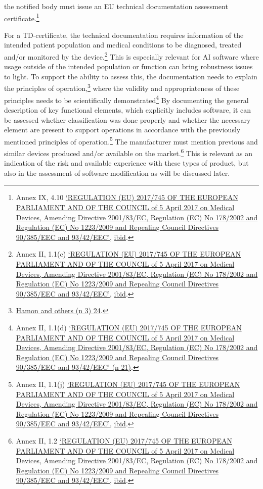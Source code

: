 \documentclass[
]{scrartcl}
\begin{document}
the notified body must issue an EU technical documentation assessment certificate.\footnote{Annex IX, 4.10 \protect\hyperlink{ref-REGULATIONEU2017a}{{`{REGULATION} ({EU}) 2017/745 {OF THE EUROPEAN PARLIAMENT AND OF THE COUNCIL} of 5 {April} 2017 on Medical Devices, Amending {Directive} 2001/83/{EC}, {Regulation} ({EC}) {No} 178/2002 and {Regulation} ({EC}) {No} 1223/2009 and Repealing {Council Directives} 90/385/{EEC} and 93/42/{EEC}'}}, \protect\hyperlink{ref-REGULATIONEU2017a}{ibid}.}

For a TD-certificate, the technical documentation requires information of the intended patient population and medical conditions to be diagnosed, treated and/or monitored by the device.\footnote{Annex II, 1.1(c) \protect\hyperlink{ref-REGULATIONEU2017a}{{`{REGULATION} ({EU}) 2017/745 {OF THE EUROPEAN PARLIAMENT AND OF THE COUNCIL} of 5 {April} 2017 on Medical Devices, Amending {Directive} 2001/83/{EC}, {Regulation} ({EC}) {No} 178/2002 and {Regulation} ({EC}) {No} 1223/2009 and Repealing {Council Directives} 90/385/{EEC} and 93/42/{EEC}'}}, \protect\hyperlink{ref-REGULATIONEU2017a}{ibid}.} This is especially relevant for AI software where usage outside of the intended population or function can bring robustness issues to light. To support the ability to assess this, the documentation needs to explain the principles of operation,\footnote{\protect\hyperlink{ref-hamonRobustnessExplainabilityArtificial2020}{Hamon and others (n 3) 24}.} where the validity and appropriateness of these principles needs to be scientifically demonstrated\footnote{Annex II, 1.1(d) \protect\hyperlink{ref-REGULATIONEU2017a}{{`{REGULATION} ({EU}) 2017/745 {OF THE EUROPEAN PARLIAMENT AND OF THE COUNCIL} of 5 {April} 2017 on Medical Devices, Amending {Directive} 2001/83/{EC}, {Regulation} ({EC}) {No} 178/2002 and {Regulation} ({EC}) {No} 1223/2009 and Repealing {Council Directives} 90/385/{EEC} and 93/42/{EEC}'} (n 21)}.} By documenting the general description of key functional elements, which explicitly includes software, it can be assessed whether classification was done properly and whether the necessary element are present to support operations in accordance with the previously mentioned principles of operation.\footnote{Annex II, 1.1(j) \protect\hyperlink{ref-REGULATIONEU2017a}{{`{REGULATION} ({EU}) 2017/745 {OF THE EUROPEAN PARLIAMENT AND OF THE COUNCIL} of 5 {April} 2017 on Medical Devices, Amending {Directive} 2001/83/{EC}, {Regulation} ({EC}) {No} 178/2002 and {Regulation} ({EC}) {No} 1223/2009 and Repealing {Council Directives} 90/385/{EEC} and 93/42/{EEC}'}}, \protect\hyperlink{ref-REGULATIONEU2017a}{ibid}.} The manufacturer must mention previous and similar devices produced and/or available on the market.\footnote{Annex II, 1.2 \protect\hyperlink{ref-REGULATIONEU2017a}{{`{REGULATION} ({EU}) 2017/745 {OF THE EUROPEAN PARLIAMENT AND OF THE COUNCIL} of 5 {April} 2017 on Medical Devices, Amending {Directive} 2001/83/{EC}, {Regulation} ({EC}) {No} 178/2002 and {Regulation} ({EC}) {No} 1223/2009 and Repealing {Council Directives} 90/385/{EEC} and 93/42/{EEC}'}}, \protect\hyperlink{ref-REGULATIONEU2017a}{ibid}.} This is relevant as an indication of the risk and available experience with these types of product, but also in the assessment of software modification as will be discussed later.
\end{document}
